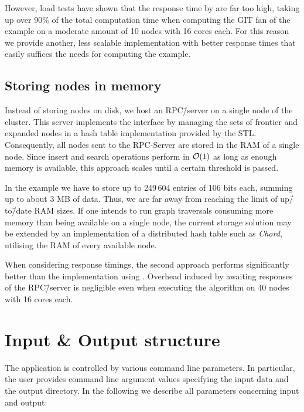 However, load tests have shown that the response time by \beegfs{} are far too high, taking up over 90\% of the total computation time when computing the GIT fan of the \msix{} example on a moderate amount of 10 nodes with 16 cores each. For this reason we provide another, less scalable implementation with better response times that easily suffices the needs for computing the \msix{} example.

\subsection{Storing nodes in memory}

Instead of storing nodes on disk, we host an RPC\=/server on a single node of the cluster. This server implements the interface by managing the sets of frontier and expanded nodes in a hash table implementation provided by the \ac{STL}. Consequently, all nodes sent to the RPC-Server are stored in the RAM of a single node. Since insert and search operations perform in $\mathcal{O}(1)$ as long as enough memory 
is available, this approach scales until a certain threshold is passed.

In the \msix{} example we have to store up to 249\,604 entries of 106 bits each, summing up to about 3 MB of data. Thus, we are far away from reaching the limit of up\=/to\=/date RAM sizes. If one intends to run graph traversals consuming more memory than being available on a single node, the current storage solution may be extended by an implementation of a distributed hash table such as \emph{Chord}, utilising the RAM of every available node. \cite{chord}

When considering response timings, the second approach performs significantly better than the implementation using \beegfs{}. Overhead induced by awaiting responses of the RPC\=/server is negligible even when executing the algorithm on 40 nodes with 16 cores each.

\section{Input \& Output structure}

The application is controlled by various command line parameters. In particular, the user provides command line argument values specifying the input data and the output directory. In the following we describe all parameters concerning input and output:

